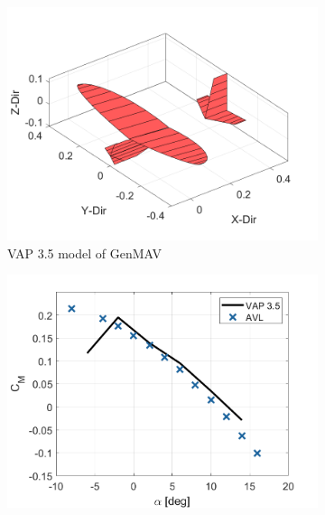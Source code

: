 \begin{figure}[H]
     \centering
     \begin{subfigure}[b]{0.45\textwidth}
          \centering
        \includegraphics[width=\textwidth]{05_Results/Figs/VAP/genMAV/modelb.png}
        \caption{VAP 3.5 model of GenMAV}
            \label{fig:genMAVDimensions}
            

     \end{subfigure}
     \begin{subfigure}[b]{0.45\textwidth}
                \centering
            \includegraphics[width=\textwidth]{05_Results/Figs/VAP/genMAV/GenMAVModelValidation1.png}
            

\end{subfigure}
\end{figure}
